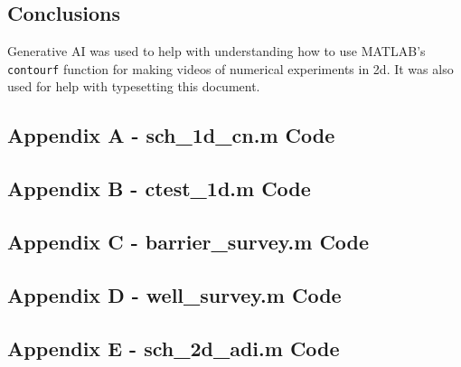 \documentclass[10pt]{article}
\def\code#1{\texttt{#1}} %
\begin{document}
\subsection*{Conclusions}



Generative AI was used to help with understanding how to use MATLAB's \code{contourf} function for 
making videos of numerical experiments in 2d. It was also used for help with typesetting this 
document.

\pagebreak


\subsection*{Appendix A - sch\_1d\_cn.m Code}

\pagebreak

\subsection*{Appendix B - ctest\_1d.m Code}

\pagebreak

\subsection*{Appendix C - barrier\_survey.m Code}

\pagebreak

\subsection*{Appendix D - well\_survey.m Code}

\pagebreak

\subsection*{Appendix E - sch\_2d\_adi.m Code}

\pagebreak
\end{document}
